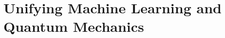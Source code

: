 \chapter{Unifying Machine Learning and Quantum Mechanics} \label{chp:VMCwRBM}
\iffalse
\begin{figure}[H]
	\centering
	\texttt{[image: ../Images/randomwalk.eps]}
	\caption{Random walker on a two-dimensional grid, 1000 moves.}
\end{figure}
\fi

